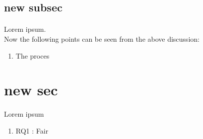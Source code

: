 \documentclass[12pt,a4paper]{article}%
\begin{document}
    
    \subsection{new subsec}
    \paragraph{}
    \justify
    Lorem ipsum. \\
    
    Now the following points can be seen from the above discussion:
    
    \begin{enumerate}
    	\item The proces
    	
    \end{enumerate}

	\pagebreak
		
	\section{new sec }
	\paragraph{}
	\justify
Lorem ipsum
	\begin{enumerate}
		\item RQ1 : Fair
	\end{enumerate}
	\pagebreak
	
\end{document}
